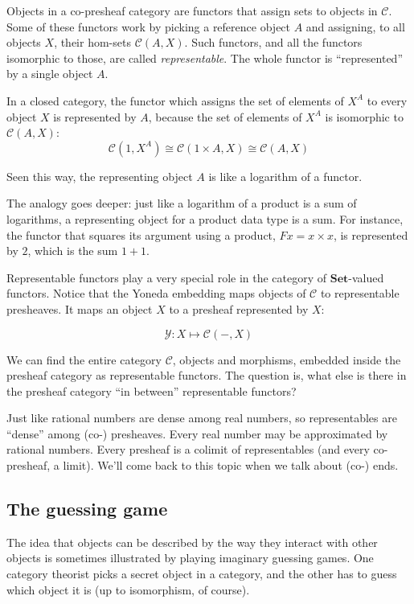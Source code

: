 \documentclass[DaoFP]{subfiles}
\begin{document}
Objects in a  co-presheaf category are functors that assign sets to objects in $\mathcal{C}$. Some of these functors work by picking a reference object $A$ and assigning,  to all objects $X$, their hom-sets  $\mathcal{C}(A, X)$. Such functors, and all the functors isomorphic to those, are called \emph{representable}. The whole functor is ``represented'' by a single object $A$. 

In a closed category, the functor which assigns the set of elements of $X^A$ to every object $X$ is represented by $A$, because the set of elements of $X^A$ is isomorphic to $\mathcal{C}(A, X)$:
\[\mathcal{C}(1, X^A) \cong \mathcal{C}(1 \times A, X) \cong \mathcal{C} (A, X)\]

Seen this way, the representing object $A$ is like a logarithm of a functor. 

The analogy goes deeper: just like a logarithm of a product is a sum of logarithms, a representing object for a product data type is a sum. For instance, the functor that squares its argument using a product, $F x = x \times x$, is represented by $2$, which is the sum $1 + 1$. 

Representable functors play a very special role in the category of $ \mathbf{Set}$-valued functors. Notice that the Yoneda embedding maps objects of $\mathcal{C}$ to representable presheaves. It maps an object $X$ to a presheaf represented by $X$: 

\[  \mathcal{Y} \colon X \mapsto \mathcal{C}(-, X) \]

We can find the entire category  $\mathcal{C}$, objects and morphisms, embedded inside the presheaf category as representable functors. The question is, what else is there in the presheaf category ``in between'' representable functors?

Just like rational numbers are dense among real numbers, so representables are ``dense'' among (co-) presheaves. Every real number may be approximated by rational numbers. Every presheaf is a colimit of representables (and every co-presheaf, a limit). We'll come back to this topic when we talk about (co-) ends.

\subsection{The guessing game}

The idea that objects can be described by the way they interact with other objects is sometimes illustrated by playing imaginary guessing games. One category theorist picks a secret object in a category, and the other has to guess which object it is (up to isomorphism, of course). 
\end{document}
